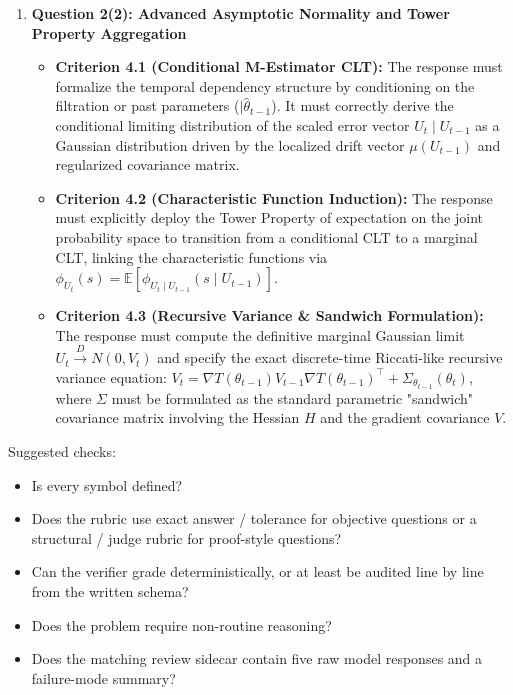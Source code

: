 \documentclass[../../../main.tex]{subfiles}
\begin{document}
\begin{msbproblem}
\begin{gradingscheme}
\begin{enumerate}[label=\arabic*.]
\item \textbf{Question 2(2): Advanced Asymptotic Normality and Tower Property Aggregation}
\begin{itemize}
\item \textbf{Criterion 4.1 (Conditional M-Estimator CLT):} The response must formalize the temporal dependency structure by conditioning on the filtration or past parameters ($\mid \widehat\theta_{t-1}$). It must correctly derive the conditional limiting distribution of the scaled error vector $U_t \mid U_{t-1}$ as a Gaussian distribution driven by the localized drift vector $\mu(U_{t-1})$ and regularized covariance matrix.
\item \textbf{Criterion 4.2 (Characteristic Function Induction):} The response must explicitly deploy the Tower Property of expectation on the joint probability space to transition from a conditional CLT to a marginal CLT, linking the characteristic functions via $\phi_{U_t}(s) = \mathbb{E}\left[\phi_{U_t\mid U_{t-1}}(s\mid U_{t-1})\right]$.
\item \textbf{Criterion 4.3 (Recursive Variance \& Sandwich Formulation):} The response must compute the definitive marginal Gaussian limit $U_t \xrightarrow{D} N(0, V_t)$ and specify the exact discrete-time Riccati-like recursive variance equation: $V_t = \nabla T(\theta_{t-1})V_{t-1}\nabla T(\theta_{t-1})^\top + \Sigma_{\theta_{t-1}}(\theta_t)$, where $\Sigma$ must be formulated as the standard parametric "sandwich" covariance matrix involving the Hessian $H$ and the gradient covariance $V$.
\end{itemize}
\end{enumerate}
\end{gradingscheme}

\begin{editornotes}
Suggested checks:
\begin{itemize}
\item Is every symbol defined?
\item Does the rubric use exact answer / tolerance for objective questions or a structural / judge rubric for proof-style questions?
\item Can the verifier grade deterministically, or at least be audited line by line from the written schema?
\item Does the problem require non-routine reasoning?
\item Does the matching review sidecar contain five raw model responses and a failure-mode summary?
\end{itemize}
\end{editornotes}

\end{msbproblem}
\end{document}
